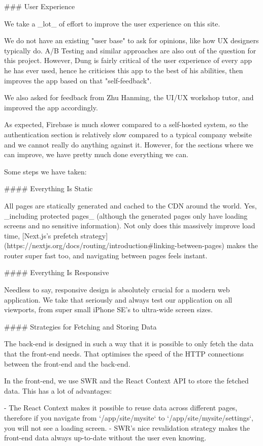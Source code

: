 \documentclass[11pt]{article}
\begin{document}
\begin{markdown}
### User Experience

We take a _lot_ of effort to improve the user experience on this site.

We do not have an existing "user base" to ask for opinions, like how UX designers typically do. A/B Testing and similar approaches are also out of the question for this project. However, Dung is fairly critical of the user experience of every app he has ever used, hence he criticises this app to the best of his abilities, then improves the app based on that "self-feedback".

We also asked for feedback from Zhu Hanming, the UI/UX workshop tutor, and improved the app accordingly.

As expected, Firebase is much slower compared to a self-hosted system, so the authentication section is relatively slow compared to a typical company website and we cannot really do anything against it. However, for the sections where we can improve, we have pretty much done everything we can.

Some steps we have taken:

#### Everything Is Static

All pages are statically generated and cached to the CDN around the world. Yes, _including protected pages_ (although the generated pages only have loading screens and no sensitive information). Not only does this massively improve load time, [Next.js's prefetch strategy](https://nextjs.org/docs/routing/introduction#linking-between-pages) makes the router super fast too, and navigating between pages feels instant.

#### Everything Is Responsive

Needless to say, responsive design is absolutely crucial for a modern web application. We take that seriously and always test our application on all viewports, from super small iPhone SE's to ultra-wide screen sizes.

#### Strategies for Fetching and Storing Data

The back-end is designed in such a way that it is possible to only fetch the data that the front-end needs. That optimises the speed of the HTTP connections between the front-end and the back-end.

In the front-end, we use SWR and the React Context API to store the fetched data. This has a lot of advantages:

- The React Context makes it possible to reuse data across different pages, therefore if you navigate from `/app/site/mysite` to `/app/site/mysite/settings`, you will not see a loading screen.
- SWR's nice revalidation strategy makes the front-end data always up-to-date without the user even knowing.


\end{markdown}
\end{document}
